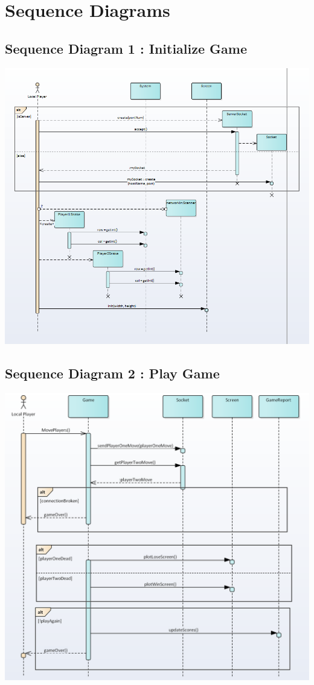 \documentclass[titlepage]{article}
\begin{document}
	
	
	\section{Sequence Diagrams}
	\subsection{Sequence Diagram 1 : Initialize Game}
	\includegraphics[scale=.75]{Sequence1}
	
	\subsection{Sequence Diagram 2 : Play Game}
	\includegraphics[scale=1]{Sequence2}
	
\end{document}
